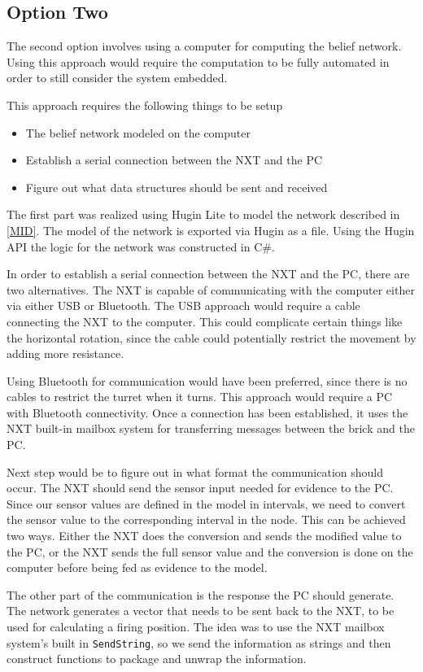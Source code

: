 \subsection{Option Two}
The second option involves using a computer for computing the
belief network. Using this approach would require the computation to be fully
automated in order to still consider the system embedded.\nl

This approach requires the following things to be setup
\begin{itemize}
\item The belief network modeled on the computer
\item Establish a serial connection between the NXT and the PC
\item Figure out what data structures should be sent and received
\end{itemize}

The first part was realized using Hugin Lite to model the network described
in \autoref{MID}. The model of the network is exported via Hugin as a file.
Using the Hugin API the logic for the network was constructed in C\#.\nl

In order to establish a serial connection between the NXT and the PC, there are
two alternatives. The NXT is capable of communicating with the computer either
via either USB or Bluetooth. The USB approach would require a cable connecting
the NXT to the computer.
This could complicate certain things like the horizontal rotation, since the
cable could potentially restrict the movement by adding more resistance.\nl

Using Bluetooth for communication would have been preferred, since there is
no cables to restrict the turret when it turns. 
This approach would require a PC with Bluetooth connectivity. Once a connection
has been established, it uses the NXT built-in mailbox system for transferring
messages between the brick and the PC.\nl

Next step would be to figure out in what format the communication should occur.
The NXT should send the sensor input needed for evidence to the PC. Since our
sensor values are defined in the model in intervals, we need to convert the
sensor value to the corresponding interval in the node. This can be achieved two ways. Either
the NXT does the conversion and sends the modified value to the PC, or the NXT
sends the full sensor value and the conversion is done on the computer before
being fed as evidence to the model.\nl

The other part of the communication is the response the PC should generate. The
network generates a vector that needs to be sent back to the NXT, to be used for
calculating a firing position. The idea was to use the NXT mailbox system's
built in \texttt{SendString}, so we send the information as strings and then
construct functions to package and unwrap the information.

